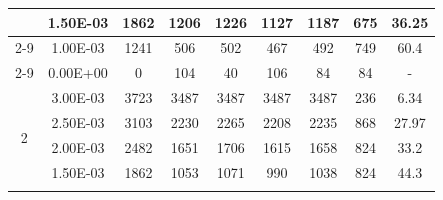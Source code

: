 \begin{table}[H]
{\begin{tabular}{|c|c|c|c|c|c|c|c|c|}
                               & 1.50E-03         & 1862      & 1206                                                       & 1226                                                      & 1127                                                      & 1187    & 675    & 36.25                                                              \\ \cline{2-9}
                               & 1.00E-03         & 1241      & 506                                                        & 502                                                       & 467                                                       & 492     & 749    & 60.4                                                               \\ \cline{2-9}
                               & 0.00E+00         & 0         & 104                                                        & 40                                                        & 106                                                       & 84      & 84     & -                                                                  \\ \hline
            \multirow{6}{*}{2} & 3.00E-03         & 3723      & 3487                                                       & 3487                                                      & 3487                                                      & 3487    & 236    & 6.34                                                               \\ \cline{2-9}
                               & 2.50E-03         & 3103      & 2230                                                       & 2265                                                      & 2208                                                      & 2235    & 868    & 27.97                                                              \\ \cline{2-9}
                               & 2.00E-03         & 2482      & 1651                                                       & 1706                                                      & 1615                                                      & 1658    & 824    & 33.2                                                               \\ \cline{2-9}
                               & 1.50E-03         & 1862      & 1053                                                       & 1071                                                      & 990                                                       & 1038    & 824    & 44.3                                                               \\ \cline{2-9}

\end{tabular}}
\end{table}

